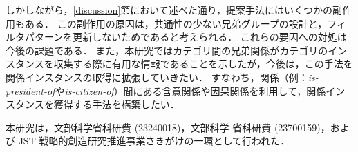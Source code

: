 \documentclass[japanese]{jnlp_1.4}
\begin{document}
しかしながら，\ref{discussion}節において述べた通り，提案手法にはいくつかの副作用もある．
この副作用の原因は，共通性の少ない兄弟グループの設計と，フィルタパターンを更新しないためであると考えられる．
これらの要因への対処は今後の課題である．
また，本研究ではカテゴリ間の兄弟関係がカテゴリのインスタンスを収集する際に有用な情報であることを示したが，今後は，この手法を関係インスタンスの取得に拡張していきたい．
すなわち，関係（例：{\it is-president-of}や{\it is-citizen-of}）間にある含意関係や因果関係を利用して，関係インスタンスを獲得する手法を構築したい．




\acknowledgment
本研究は，文部科学省科研費 (23240018)，文部科学 省科研費 (23700159)，および JST 戦略的創造研究推進事業さきがけの一環として行われた．
\end{document}
